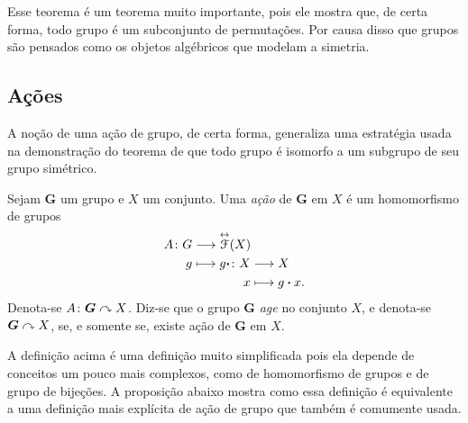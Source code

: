 	Esse teorema é um teorema muito importante, pois ele mostra que, de certa forma, todo grupo é um subconjunto de permutações. Por causa disso que grupos são pensados como os objetos algébricos que modelam a simetria.

\subsection{Ações}

A noção de uma ação de grupo, de certa forma, generaliza uma estratégia usada na demonstração do teorema de que todo grupo é isomorfo a um subgrupo de seu grupo simétrico.

\begin{definition}
Sejam $\bm G$ um grupo e $X$ um conjunto. Uma \emph{ação} de $\bm G$ em $X$ é um homomorfismo de grupos
	\begin{align*}
	\func{A}{G}{\Iso{\Func}(X)}{g}{
		\begin{aligned}[t]
		\func{g\pt}{X}{X}{x}{g\pt x}.
		\end{aligned}
	}
	\end{align*}
Denota-se ${A}\colon {\bm G} \curvearrowright {X}$. Diz-se que o grupo $\bm G$ \emph{age} no conjunto $X$, e denota-se $\bm G \curvearrowright X$, se, e somente se, existe ação de $\bm G$ em $X$.
\end{definition}

A definição acima é uma definição muito simplificada pois ela depende de conceitos um pouco mais complexos, como de homomorfismo de grupos e de grupo de bijeções. A proposição abaixo mostra como essa definição é equivalente a uma definição mais explícita de ação de grupo que também é comumente usada.

